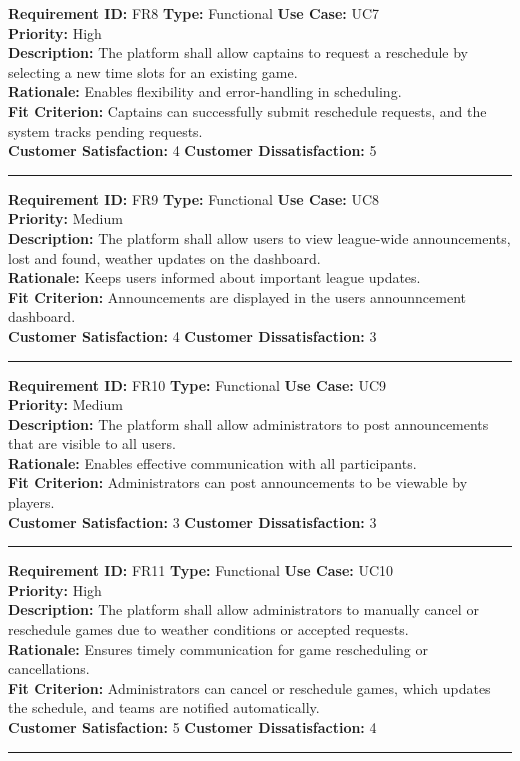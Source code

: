 \documentclass[12pt, titlepage]{article}
\begin{document}
\textbf{Requirement ID:} FR8 \quad \textbf{Type:} Functional \quad \textbf{Use Case:} UC7 \\
\textbf{Priority:} High \\
\textbf{Description:} The platform shall allow captains to request a reschedule by selecting a new time slots for an existing game.\\
\textbf{Rationale:} Enables flexibility and error-handling in scheduling.\\
\textbf{Fit Criterion:} Captains can successfully submit reschedule requests, and the system tracks pending requests.\\
\textbf{Customer Satisfaction:} 4 \quad\quad \textbf{Customer Dissatisfaction:} 5\\
\noindent\rule{\textwidth}{1pt}

\textbf{Requirement ID:} FR9 \quad \textbf{Type:} Functional \quad \textbf{Use Case:} UC8 \\
\textbf{Priority:} Medium \\
\textbf{Description:} The platform shall allow users to view league-wide announcements, lost and found, weather updates on the dashboard.\\
\textbf{Rationale:} Keeps users informed about important league updates. \\
\textbf{Fit Criterion:} Announcements are displayed in the users announncement dashboard.\\
\textbf{Customer Satisfaction:} 4 \quad\quad \textbf{Customer Dissatisfaction:} 3\\
\noindent\rule{\textwidth}{1pt}

\textbf{Requirement ID:} FR10 \quad \textbf{Type:} Functional \quad \textbf{Use Case:} UC9 \\
\textbf{Priority:} Medium \\
\textbf{Description:} The platform shall allow administrators to post announcements that are visible to all users.\\
\textbf{Rationale:} Enables effective communication with all participants.\\
\textbf{Fit Criterion:} Administrators can post announcements to be viewable by players.\\
\textbf{Customer Satisfaction:} 3 \quad\quad \textbf{Customer Dissatisfaction:} 3\\
\noindent\rule{\textwidth}{1pt}

\textbf{Requirement ID:} FR11 \quad \textbf{Type:} Functional \quad \textbf{Use Case:} UC10 \\
\textbf{Priority:} High \\
\textbf{Description:} The platform shall allow administrators to manually cancel or reschedule games due to weather conditions or accepted requests.\\
\textbf{Rationale:} Ensures timely communication for game rescheduling or cancellations.\\
\textbf{Fit Criterion:} Administrators can cancel or reschedule games, which updates the schedule, and teams are notified automatically. \\
\textbf{Customer Satisfaction:} 5 \quad\quad \textbf{Customer Dissatisfaction:} 4\\
\noindent\rule{\textwidth}{1pt}
\end{document}
